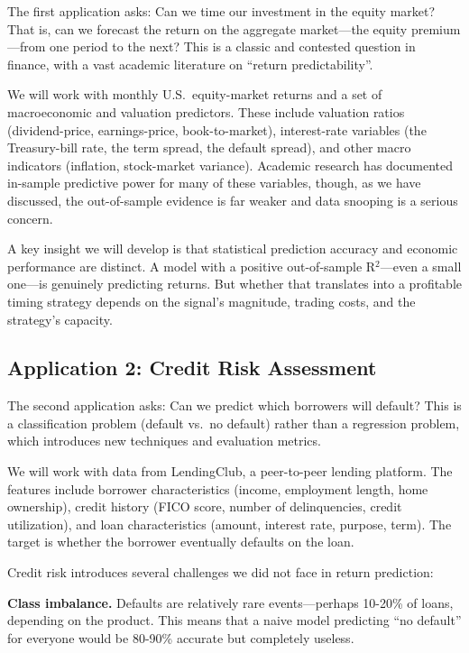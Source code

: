 \documentclass[11pt,a4paper]{article}
\begin{document}
The first application asks: Can we time our investment in the equity market? That is, can we forecast the return on the aggregate market---the equity premium---from one period to the next? This is a classic and contested question in finance, with a vast academic literature on ``return predictability''.

We will work with monthly U.S.\ equity-market returns and a set of macroeconomic and valuation predictors. These include valuation ratios (dividend-price, earnings-price, book-to-market), interest-rate variables (the Treasury-bill rate, the term spread, the default spread), and other macro indicators (inflation, stock-market variance). Academic research has documented in-sample predictive power for many of these variables, though, as we have discussed, the out-of-sample evidence is far weaker and data snooping is a serious concern.

A key insight we will develop is that statistical prediction accuracy and economic performance are distinct. A model with a positive out-of-sample R$^2$---even a small one---is genuinely predicting returns. But whether that translates into a profitable timing strategy depends on the signal's magnitude, trading costs, and the strategy's capacity.

\subsection{Application 2: Credit Risk Assessment}

The second application asks: Can we predict which borrowers will default? This is a classification problem (default vs.\ no default) rather than a regression problem, which introduces new techniques and evaluation metrics.

We will work with data from LendingClub, a peer-to-peer lending platform. The features include borrower characteristics (income, employment length, home ownership), credit history (FICO score, number of delinquencies, credit utilization), and loan characteristics (amount, interest rate, purpose, term). The target is whether the borrower eventually defaults on the loan.

Credit risk introduces several challenges we did not face in return prediction:

\textbf{Class imbalance.} Defaults are relatively rare events---perhaps 10-20\% of loans, depending on the product. This means that a naive model predicting ``no default'' for everyone would be 80-90\% accurate but completely useless.
\end{document}
